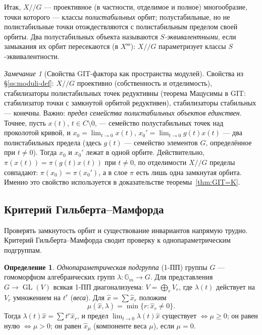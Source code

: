 \documentclass[11pt,a4paper]{article}
\theoremstyle{plain}
\theoremstyle{definition}
\newtheorem{definition}[theorem]{Определение}
\theoremstyle{remark}
\newtheorem{remark}[theorem]{Замечание}
\newcommand{\Gm}{\mathbb{G}_m}
\DeclareMathOperator{\GL}{GL}
\newcommand{\ssl}{\mathrm{ss}}
\begin{document}
Итак, $X/\!/G$ --- проективное (в частности, отделимое и полное) многообразие, точки которого
--- классы \emph{полистабильных} орбит; полустабильные, но не полистабильные точки отождествляются
с полистабильным пределом своей орбиты. Два полустабильных объекта называются
\emph{$S$-эквивалентными}, если замыкания их орбит пересекаются (в $X^{\ssl}$): $X/\!/G$
параметризует классы $S$-эквивалентности.

\begin{remark}[Свойства GIT-фактора как пространства модулей]
Свойства из \S\ref{ss:moduli-def}: $X/\!/G$ проективно (собственность и отделимость), стабилизаторы
полистабильных точек редуктивны (теорема Мацусимы в GIT: стабилизатор точки с замкнутой орбитой
редуктивен), стабилизаторы стабильных --- конечны. Важно: \emph{предел семейства полистабильных
объектов единствен}. Точнее, пусть $x(t)$, $t\in C\setminus0$, --- семейство полустабильных точек над
проколотой кривой, и $x_0=\lim_{t\to0}x(t)$, $x_0'=\lim_{t\to0}g(t)x(t)$ --- два полистабильных
предела (здесь $g(t)$ --- семейство элементов $G$, определённое при $t\ne0$). Тогда $x_0$ и $x_0'$
лежат в одной орбите. Действительно, $\pi(x(t))=\pi(g(t)x(t))$ при $t\ne0$, по отделимости
$X/\!/G$ пределы совпадают: $\pi(x_0)=\pi(x_0')$, а в слое $\pi$ есть лишь одна замкнутая орбита.
Именно это свойство используется в доказательстве теоремы~\ref{thm:GIT=K}.
\end{remark}

\subsection{Критерий Гильберта--Мамфорда}

Проверять замкнутость орбит и существование инвариантов напрямую трудно. Критерий
Гильберта--Мамфорда сводит проверку к однопараметрическим подгруппам.

\begin{definition}
\emph{Однопараметрическая подгруппа} (1-ПП) группы $G$ --- гомоморфизм алгебраических групп
$\lambda\colon\Gm\to G$. Для представления $G\to\GL(V)$ всякая 1-ПП диагонализуема: $V=\bigoplus_rV_r$,
где $\lambda(t)$ действует на $V_r$ умножением на $t^r$ (\emph{веса}). Для $\hat x=\sum\hat x_r$
положим
\[
\mu(\hat x,\lambda)=\min\{r:\hat x_r\ne0\}.
\]
Тогда $\lambda(t)\hat x=\sum t^r\hat x_r$, и предел $\lim_{t\to0}\lambda(t)\hat x$ существует
$\iff\mu\ge0$; он равен нулю $\iff\mu>0$; он равен $\hat x_{\mu}$ (компоненте веса $\mu$), если $\mu=0$.
\end{definition}
\end{document}
